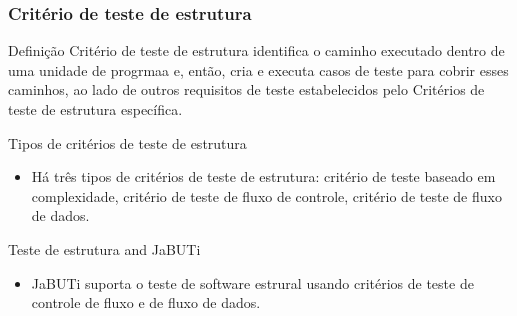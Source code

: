 \begin{frame}[parent={cmap:structural-software-testing},hasnext=true,hasprev=true]
\frametitle{Critério de teste de estrutura}
\label{concept:structural-test-criterion}

\begin{block:concept}{Definição}
Critério de teste de estrutura identifica o caminho executado dentro de uma 
unidade de progrmaa e, então, cria e executa casos de teste para cobrir esses 
caminhos, ao lado de outros requisitos de teste estabelecidos pelo Critérios 
de teste de estrutura específica.
\end{block:concept}


\begin{block:fact}{Tipos de critérios de teste de estrutura}
\begin{itemize}
	\item Há três tipos de critérios de teste de estrutura: critério de teste 
	baseado em complexidade, critério de teste de fluxo de controle, critério de teste de fluxo de dados.
\end{itemize}
\end{block:fact}

\begin{block:fact}{Teste de estrutura and JaBUTi}
\begin{itemize}
	\item JaBUTi suporta o teste de software estrural usando critérios de teste de controle de fluxo e de fluxo de dados.
\end{itemize}
\end{block:fact}
\end{frame}